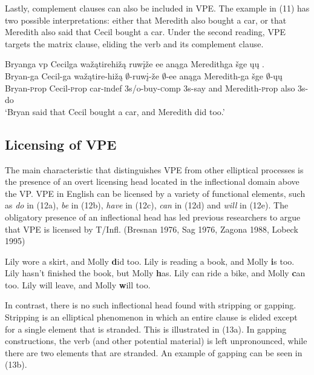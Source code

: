 \documentclass[output=paper]{LSP/langsci}
\begin{document}
Lastly, complement clauses can also be included in VPE. The example in (11) has two possible interpretations: either that Meredith also bought a car, or that Meredith also said that Cecil bought a car. Under the second reading, VPE targets the matrix clause, eliding the verb and its complement clause.

\begin{exe}
\ex
\glll Bryanga {\ob}{vp} Cecilga wažątirehižą ruwįže ee{\cb} anąga Meredithga šge {\ob}ųų{\cb} .\\
Bryan-ga {} Cecil-ga wažątire-hižą $\emptyset$-ruwį-že $\emptyset$-ee anąga Meredith-ga šge $\emptyset$-ųų\\
Bryan-{\textsc prop} {} Cecil-{\textsc prop} car-{\textsc indef} {\textsc 3s/o}-buy-{\textsc comp} {\textsc 3s}-say and Meredith-{\textsc prop} also {\textsc 3s}-do\\
\trans `Bryan said that Cecil bought a car, and Meredith did too.'
\end{exe}


\subsection{Licensing of VPE}

The main characteristic that distinguishes VPE from other elliptical processes is the presence of an overt licensing head located in the inflectional domain above the VP. VPE in English can be licensed by a variety of functional elements, such as \emph{do} in (12a), \emph{be} in (12b), \emph{have} in (12c), \emph{can} in (12d) and \emph{will} in (12e). The obligatory presence of an inflectional head has led previous researchers to argue that VPE is licensed by T/Infl. (Bresnan 1976, Sag 1976, Zagona 1988, Lobeck 1995)

\begin{exe}
\ex
\begin{xlist}
\ex
Lily wore a skirt, and Molly {\textbf did} too.
\ex
Lily is reading a book, and Molly {\textbf is} too.
\ex
Lily hasn't finished the book, but Molly {\textbf has}.
\ex
Lily can ride a bike, and Molly {\textbf can} too.
\ex
Lily will leave, and Molly {\textbf will} too.
\end{xlist}
\end{exe}


In contrast, there is no such inflectional head found with stripping or gapping. Stripping is an elliptical phenomenon in which an entire clause is elided except for a single element that is stranded. This is illustrated in (13a). In gapping constructions, the verb (and other potential material) is left unpronounced, while there are two elements that are stranded. An example of gapping can be seen in (13b).
\end{document}
